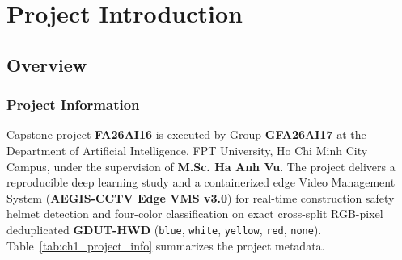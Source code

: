 \chapter{Project Introduction}
\label{chap:intro}

\section{Overview}

\subsection{Project Information}

Capstone project \textbf{FA26AI16} is executed by Group \textbf{GFA26AI17} at the Department of Artificial Intelligence, FPT University, Ho Chi Minh City Campus, under the supervision of \textbf{M.Sc. Ha Anh Vu}. The project delivers a reproducible deep learning study and a containerized edge Video Management System (\textbf{AEGIS-CCTV Edge VMS v3.0}) for real-time construction safety helmet detection and four-color classification on exact cross-split RGB-pixel deduplicated \textbf{GDUT-HWD} (\texttt{blue}, \texttt{white}, \texttt{yellow}, \texttt{red}, \texttt{none}). Table~\ref{tab:ch1_project_info} summarizes the project metadata.


